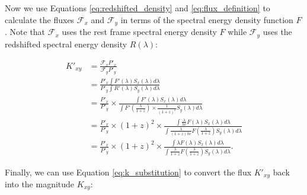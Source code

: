 \documentclass{article}
\begin{document}
Now we use Equations \ref{eq:redshifted_density} and \ref{eq:flux_definition}
to calculate the fluxes $\mathcal{F}_x$ and $\mathcal{F}_y$ in terms of the
spectral energy density function $F$. Note that $\mathcal{F}_x$ uses the rest
frame spectral energy density $F$ while $\mathcal{F}_y$ uses the redshifted
spectral energy density $R(\lambda)$:

\begin{equation}
\begin{aligned}
  K'_{xy} &= \frac{\mathcal{F}_x P'_x}{\mathcal{F}_y P'_y} \\
         &= \frac{P'_x \int F'(\lambda) S_x(\lambda) d\lambda}
                 {P'_y \int R'(\lambda) S_y(\lambda) d\lambda} \\
         &= \frac{P'_x}{P'_y} \times
              \frac{\int F'(\lambda) S_x(\lambda) d\lambda}
                   {\int F'(\frac{\lambda}{1+z}) \times \frac{1}{(1 + z)^2} S_y(\lambda) d\lambda} \\
         &= \frac{P'_x}{P'_y} \times (1+z)^2 \times
              \frac{\int \frac{\lambda}{hc} F(\lambda) S_x(\lambda) d\lambda}
                   {\int \frac{\lambda}{(1+z)hc} F\left(\frac{\lambda}{1+z}\right) S_y(\lambda) d\lambda} \\
         &= \frac{P'_x}{P'_y} \times (1 + z)^2 \times
              \frac{\int \lambda F(\lambda) S_x(\lambda) d\lambda}
                   {\int \frac{\lambda}{1+z} F\left(\frac{\lambda}{1+z}\right) S_y(\lambda) d\lambda} .
\end{aligned}
\end{equation}

Finally, we can use Equation \ref{eq:k_substitution} to convert the flux $K'_{xy}$ back
into the magnitude $K_{xy}$:
\end{document}
